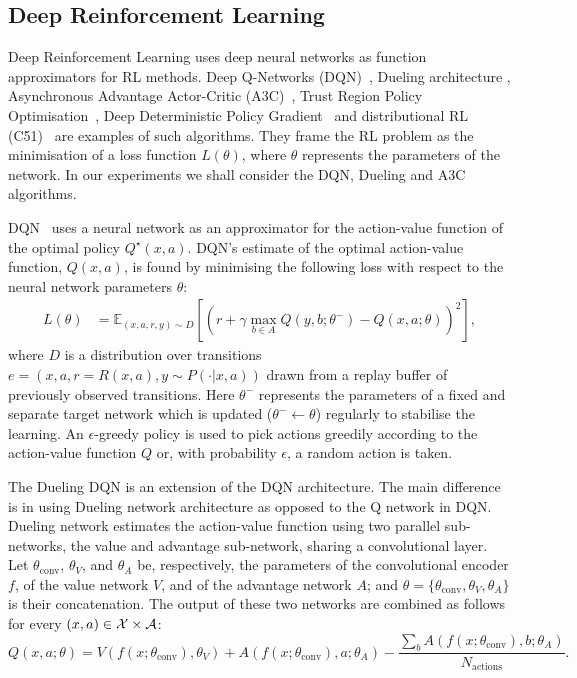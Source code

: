 \documentclass{article}
\begin{document}
\subsection{Deep Reinforcement Learning}

Deep Reinforcement Learning uses deep neural networks as function approximators for RL methods. Deep Q-Networks (DQN)~\citep{mnih2015human}, Dueling architecture \citep{wang2016Dueling}, Asynchronous Advantage Actor-Critic (A3C)~\citep{mnih2016asynchronous}, Trust Region Policy Optimisation~\citep{schulman2015trust}, Deep Deterministic Policy Gradient~\citep{lillicrap2015continuous} and distributional RL (C51)~\citep{bellemare2017distributional} are examples of such algorithms. They frame the RL problem as the minimisation of a loss function $L(\theta)$, where $\theta$ represents the parameters of the network. In our experiments we shall consider the DQN, Dueling and A3C algorithms. 

DQN~\citep{mnih2015human} uses a neural network as an approximator for the action-value function of the optimal policy $Q^\star(x, a)$.
DQN's estimate of the optimal action-value function, $Q(x,a)$, is found by minimising the following loss with respect to the neural network parameters $\theta$:
\begin{align}
L(\theta)&=\mathbb{E}_{(x,a,r,y)\sim D}\left[\left(r+ \gamma \max_{b \in A}Q(y,b;\theta^-)-Q(x,a;\theta)\right)^2\right],
\end{align} 
where $D$ is a distribution over transitions $e=(x,a,r=R(x,a),y\sim P(\cdot|x,a))$ drawn from a replay buffer of previously observed transitions. 
Here $\theta^-$ represents the parameters of a fixed and separate target network which is updated ($\theta^-\leftarrow\theta$) regularly to stabilise the learning.
An $\epsilon$-greedy policy is used to pick actions greedily according to
the action-value function $Q$ or, with probability $\epsilon$, a random action is taken.

The Dueling DQN  \citep{wang2016Dueling} is an extension of the DQN  architecture. The main difference is in using Dueling network architecture as opposed to the Q network in DQN. Dueling network estimates the action-value function using two parallel sub-networks, the value and advantage sub-network, sharing a convolutional layer. Let $\theta_{\text{conv}}$, $\theta_V$, and $\theta_A$ be, respectively, the parameters of the convolutional encoder $f$, of the value network $V$, and of the advantage network $A$; and $\theta =\{\theta_{\text{conv}},\theta_V,\theta_A\}$ is their concatenation. The output of these two networks are combined  as follows for every  $(x,a)\in \mathcal X\times\mathcal A$:
\begin{equation} 
\label{Dueling}
Q(x,a;\theta) = V(f(x;\theta_{\text{conv}}),\theta_V) + A(f(x;\theta_{\text{conv}}),a;\theta_A) - \frac{\sum_{b}A(f(x;\theta_{\text{conv}}),b;\theta_A)}{N_\text{actions}}.
\end{equation}
\end{document}
